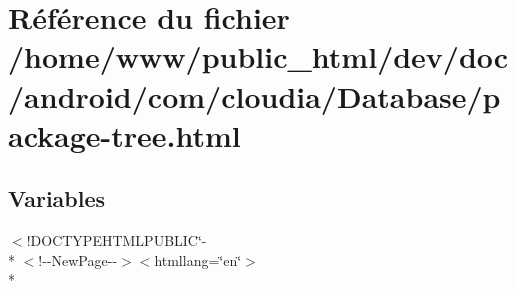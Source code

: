 \hypertarget{com_2cloudia_2_database_2package-tree_8html}{\section{Référence du fichier /home/www/public\-\_\-html/dev/doc/android/com/cloudia/\-Database/package-\/tree.html}
\label{com_2cloudia_2_database_2package-tree_8html}
}
\subsection*{Variables}
\begin{DoxyCompactItemize}
\item 
$<$!D\-O\-C\-T\-Y\-P\-E\-H\-T\-M\-L\-P\-U\-B\-L\-I\-C\char`\"{}-\/\\*
$<$!-\/-\/New\-Page-\/-\/$>$$<$htmllang=\char`\"{}en\char`\"{}$>$\\*
$$
\end{DoxyCompactItemize}
